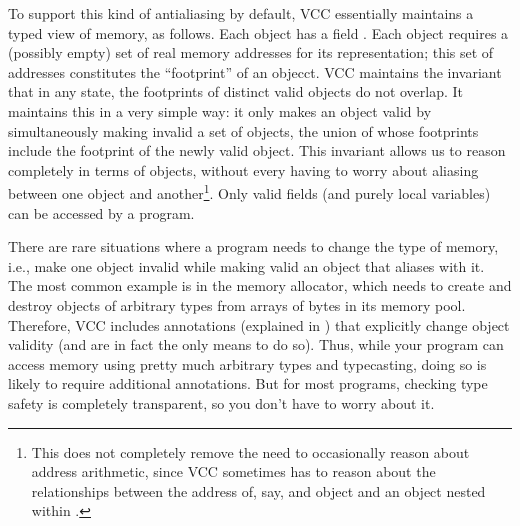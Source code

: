 To support this kind of antialiasing by default, VCC essentially
maintains a typed view of memory, as follows. Each object has a
\vcc{\bool} field \vcc{\valid}. Each object requires a (possibly
empty) set of real memory addresses for its representation; this set
of addresses constitutes the ``footprint'' of an objecct. VCC
maintains the invariant that in any state, the footprints of distinct
valid objects do not overlap. It maintains this in a very simple way:
it only makes an object valid by simultaneously making invalid a set
of objects, the union of whose footprints include the footprint of the
newly valid object. This invariant allows us to reason completely in
terms of objects, without every having to worry about aliasing between
one object and another\footnote{
This does not completely remove the need to occasionally reason about
address arithmetic, since VCC sometimes has to reason about the
relationships between the address of, say, and object  and an
object  nested within .
}. Only valid fields (and purely local variables) can be
accessed by a program.

There are rare situations where a program needs to change the type of
memory, i.e., make one object invalid while making valid an object
that aliases with it. The most common example is in the memory
allocator, which needs to create and destroy objects of arbitrary
types from arrays of bytes in its memory pool. Therefore, VCC includes
annotations (explained in ) that explicitly change
object validity (and are in fact the only means to do so).  Thus,
while your program can access memory using pretty much arbitrary types
and typecasting, doing so is likely to require additional
annotations. But for most programs, checking type safety is completely
transparent, so you don't have to worry about it.


